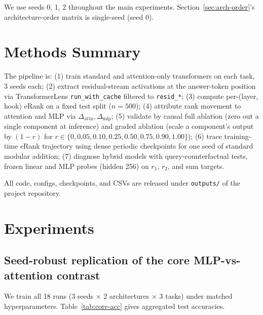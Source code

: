 \documentclass{article}
\begin{document}
We use seeds 0, 1, 2 throughout the main experiments. Section~\ref{sec:arch-order}'s architecture-order matrix is single-seed (seed 0).

\section{Methods Summary}
\label{sec:methods}

The pipeline is: (1) train standard and attention-only transformers on each task, 3 seeds each; (2) extract residual-stream activations at the answer-token position via TransformerLens \texttt{run\_with\_cache} filtered to \texttt{resid\_*}; (3) compute per-(layer, hook) eRank on a fixed test split ($n=500$); (4) attribute rank movement to attention and MLP via $\Delta_{\text{attn}}, \Delta_{\text{mlp}}$; (5) validate by causal full ablation (zero out a single component at inference) and graded ablation (scale a component's output by $(1-r)$ for $r\in\{0,0.05,0.10,0.25,0.50,0.75,0.90,1.00\}$); (6) trace training-time eRank trajectory using dense periodic checkpoints for one seed of standard modular addition; (7) diagnose hybrid models with query-counterfactual tests, frozen linear and MLP probes (hidden 256) on $r_1$, $r_2$, and sum targets.

All code, configs, checkpoints, and CSVs are released under \texttt{outputs/} of the project repository.

\section{Experiments}
\label{sec:exp}

\subsection{Seed-robust replication of the core MLP-vs-attention contrast}
\label{sec:replication}

We train all 18 runs (3 seeds $\times$ 2 architectures $\times$ 3 tasks) under matched hyperparameters. Table~\ref{tab:core-acc} gives aggregated test accuracies.
\end{document}

